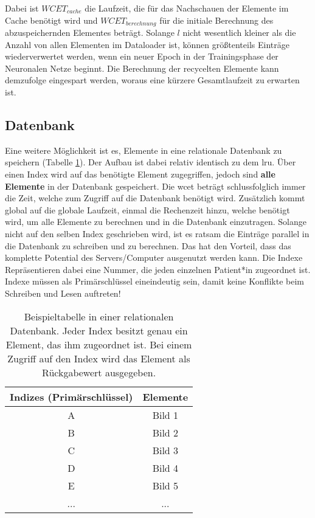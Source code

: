 Dabei ist $WCET_{cache}$ die Laufzeit, die für das Nachschauen der Elemente im Cache benötigt wird und $WCET_{berechnung}$ für die initiale Berechnung des abzuspeichernden Elementes beträgt. Solange $l$ nicht wesentlich kleiner als die Anzahl von allen Elementen im Dataloader ist, können größtenteils Einträge wiederverwertet werden, wenn ein neuer Epoch in der Trainingsphase der Neuronalen Netze beginnt. Die Berechnung der recycelten Elemente kann demzufolge eingespart werden, woraus eine kürzere Gesamtlaufzeit zu erwarten ist.




\subsection{Datenbank}\label{database}
Eine weitere Möglichkeit ist es, Elemente in eine relationale Datenbank zu speichern (Tabelle \ref{cap:database}). Der Aufbau ist dabei relativ identisch zu dem \ac{lru}. Über einen Index wird auf das benötigte Element zugegriffen, jedoch sind \textbf{alle Elemente} in der Datenbank gespeichert. Die \ac{wcet} beträgt schlussfolglich immer die Zeit, welche zum Zugriff auf die Datenbank benötigt wird. Zusätzlich kommt global auf die globale Laufzeit, einmal die Rechenzeit hinzu, welche benötigt wird, um alle Elemente zu berechnen und in die Datenbank einzutragen. Solange nicht auf den selben Index geschrieben wird, ist es ratsam die Einträge parallel in die Datenbank zu schreiben und zu berechnen. Das hat den Vorteil, dass das komplette Potential des Servers/Computer ausgenutzt werden kann. Die Indexe Repräsentieren dabei eine Nummer, die jeden einzelnen Patient*in zugeordnet ist. Indexe müssen als Primärschlüssel eineindeutig sein, damit keine Konflikte beim Schreiben und Lesen auftreten!

\begin{table}[h]\vspace{1ex}\centering
  \begin{tabular*}{9cm}{c|c}
  \textbf{Indizes (Primärschlüssel)} & \textbf{Elemente}
  \\\hline
  A   &  Bild 1 \\
  B   &  Bild 2 \\
  C   &  Bild 3 \\
  D   &  Bild 4 \\
  E   &  Bild 5 \\
  ... & ...

  \\\hline
  \end{tabular*}
  \caption[Beispieltabelle in einer relationalen Datenbank]{Beispieltabelle in einer relationalen Datenbank. Jeder Index besitzt genau ein Element, das ihm zugeordnet ist. Bei einem Zugriff auf den Index wird das Element als Rückgabewert ausgegeben.}\label{cap:database}
\vspace{2ex}\end{table}\label{table:database}


